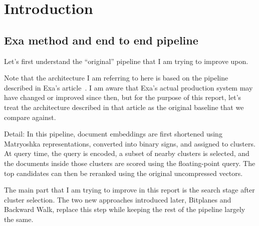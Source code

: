 \begin{abstract}
I study three ways to search binary document vectors after selecting clusters: a full scan,
Bitplanes, and Backward Walk. I compare their work, memory use and retrieval time using the
same documents and queries. The experiments examine when the extra index work saves enough
full document scores to reduce latency at a required recall.
\end{abstract}

\section{Introduction}
\subsection{Exa method and end to end pipeline}
Let's first understand the ``original'' pipeline that I am trying to improve upon.

Note that the architecture I am referring to here is based on the pipeline described in
Exa's article~\cite{exa}. I am aware that Exa's actual production system may have changed or
improved since then, but for the purpose of this report, let's treat the architecture
described in that article as the original baseline that we compare against.

Detail: In this pipeline, document embeddings are first shortened using Matryoshka
representations, converted into binary signs, and assigned to clusters. At query time,
the query is encoded, a subset of nearby clusters is selected, and the documents inside
those clusters are scored using the floating-point query. The top candidates can then be
reranked using the original uncompressed vectors.

The main part that I am trying to improve in this report is the search stage after cluster
selection. The two new approaches introduced later, Bitplanes and Backward Walk, replace
this step while keeping the rest of the pipeline largely the same.

